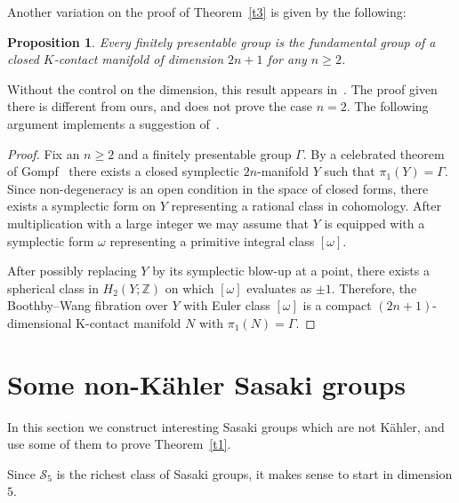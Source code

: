 \documentclass[12pt,leqno]{amsart}
\newcommand{\Z}{\mathbb{Z}}
\newcommand{\Sg}{\mathcal{S}}
\newtheorem{prop}[theor]{Proposition}
\begin{document}
Another variation on the proof of Theorem~\ref{t3} is given by the following:
\begin{prop}
Every finitely presentable group is the fundamental group of a closed $K$-contact manifold of dimension $2n+1$
for any $n\geq 2$.
\end{prop}
Without the control on the dimension, this result appears in~\cite[Theorem~5.2]{BFMT}. The proof
given there is different from ours, and does not prove the case $n=2$. The following argument implements a 
suggestion of~\cite[Remark~2.2]{AK}.
\begin{proof}
Fix an $n\geq 2$ and a finitely presentable group $\Gamma$. 
By a celebrated theorem of Gompf~\cite{Gompf} there exists a closed symplectic 
$2n$-manifold $Y$ such that $\pi_1(Y)=\Gamma$. Since non-degeneracy is an open condition in the space of closed forms,
there exists a symplectic form on $Y$ representing a rational class in cohomology. After multiplication with a large integer we may assume that $Y$ is equipped with a symplectic form $\omega$ representing a primitive integral class $[\omega]$.

After possibly replacing $Y$ by its symplectic blow-up at a point, there exists a spherical class in $H_2(Y;\Z)$ on which $[\omega]$ evaluates as $\pm 1$. Therefore, the Boothby--Wang fibration over $Y$ with Euler class $[\omega]$ is a compact $(2n+1)$-dimensional 
K-contact manifold $N$ with $\pi_1(N)=\Gamma$. 
\end{proof}


\section{Some non-K\"ahler Sasaki groups}\label{s:SasakiNotKaehler}

In this section we construct interesting Sasaki groups which are not K\"ahler, and use some of 
them to prove Theorem~\ref{t1}.

Since $\Sg_5$ is the richest class of Sasaki groups, it makes sense to start in dimension $5$.
\end{document}
